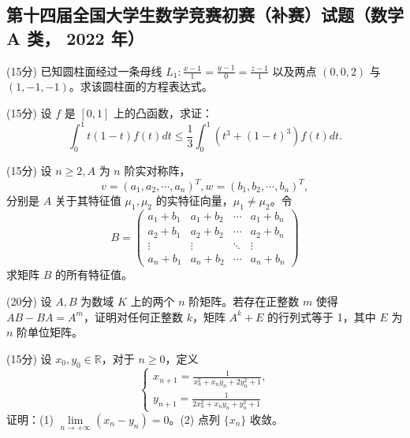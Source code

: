 \documentclass[loose]{ExBook}
\begin{document}
\subsection{第十四届全国大学生数学竞赛初赛（补赛）试题（数学 A 类， 2022 年）}
\begin{qitems}
    \begin{bbox}
        \qitem (15分) 已知圆柱面经过一条母线 \( L_1 : \frac{x-1}{1} = \frac{y-1}{0} = \frac{z-1}{1} \) 以及两点 \((0, 0, 2)\) 与 \((1, -1, -1)\)。求该圆柱面的方程表达式。
    \end{bbox}

    \begin{bbox}
        \qitem (15分) 设 \( f \) 是 \([0, 1]\) 上的凸函数，求证：
        \[
        \int_{0}^{1} t (1-t) f(t) dt \leq \frac{1}{3} \int_{0}^{1} \left( t^3 + (1-t)^3 \right) f(t) dt.
        \]
    \end{bbox}

    \begin{bbox}
        \qitem (15分) 设 \( n \geq 2, A \) 为 \( n \) 阶实对称阵，
        \[
        v = (a_1, a_2, \cdots, a_n)^T, w = (b_1, b_2, \cdots, b_n)^T,
        \]
        分别是 \( A \) 关于其特征值 \(\mu_1, \mu_2\) 的实特征向量，\(\mu_1 \neq \mu_2\)。令
        \[
        B = 
        \begin{pmatrix}
        a_1 + b_1 & a_1 + b_2 & \cdots & a_1 + b_n \\
        a_2 + b_1 & a_2 + b_2 & \cdots & a_2 + b_n \\
        \vdots & \vdots & \ddots & \vdots \\
        a_n + b_1 & a_n + b_2 & \cdots & a_n + b_n
        \end{pmatrix}
        \]
        求矩阵 \( B \) 的所有特征值。
    \end{bbox}

    \begin{bbox}
        \qitem (20分) 设 \( A, B \) 为数域 \( K \) 上的两个 \( n \) 阶矩阵。若存在正整数 \( m \) 使得 \( AB - BA = A^m \)，证明对任何正整数 \( k \)，矩阵 \( A^k + E \) 的行列式等于 1，其中 \( E \) 为 \( n \) 阶单位矩阵。
    \end{bbox}

    \begin{bbox}
        \qitem (15分) 设 \( x_0, y_0 \in \mathbb{R} \)，对于 \( n \geq 0 \)，定义
        \[
        \begin{cases}
        x_{n+1} = \frac{1}{x_n^2 + x_n y_n + 2y_n^2 + 1}, \\
        y_{n+1} = \frac{1}{2x_n^2 + x_n y_n + y_n^2 + 1}
        \end{cases}
        \]
        证明：(1) \(\lim\limits_{n \to +\infty} (x_n - y_n) = 0\)。(2) 点列 \(\{x_n\}\) 收敛。
    \end{bbox}


\end{qitems}
\end{document}
